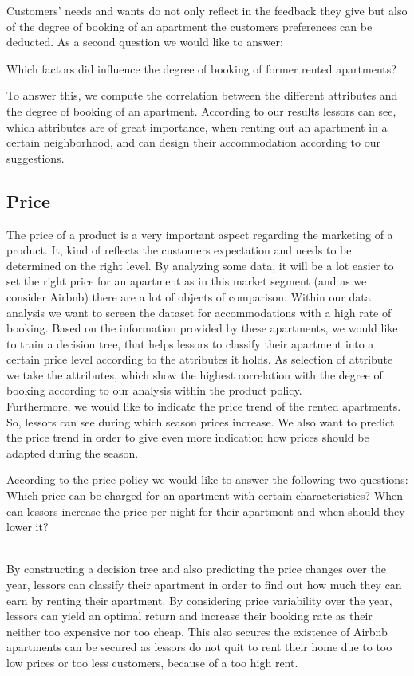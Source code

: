 Customers’ needs and wants do not only reflect in the feedback they give but also of the degree of booking of an apartment the customers preferences can be deducted. As a second question we would like to answer: \begin{itshape}Which factors did influence the degree of booking of former rented apartments? \end{itshape}To answer this, we compute the correlation between the different attributes and the degree of booking of an apartment. According to our results lessors can see, which attributes are of great importance, when renting out an apartment in a certain neighborhood, and can design their accommodation according to our suggestions. 

\subsection{Price}
\noindent The price of a product is a very important aspect regarding the marketing of a product. It, kind of reflects the customers expectation and needs to be determined on the right level. By analyzing some data, it will be a lot easier to set the right price for an apartment as in this market segment (and as we consider Airbnb) there are a lot of objects of comparison. Within our data analysis we want to screen the dataset for accommodations with a high rate of booking. Based on the information provided by these apartments, we would like to train a decision tree, that helps lessors to classify their apartment into a certain price level according to the attributes it holds. As selection of attribute we take the attributes, which show the highest correlation with the degree of booking according to our analysis within the product policy.\\ Furthermore, we would like to indicate the price trend of the rented apartments. So, lessors can see during which season prices increase. We also want to predict the price trend in order to give even more indication how prices should be adapted during the season.\\
\begin{itshape}
According to the price policy we would like to answer the following two questions: Which price can be charged for an apartment with certain characteristics? When can lessors increase the price per night for their apartment and when should they lower it?
\end{itshape}
\\By constructing a decision tree and also predicting the price changes over the year, lessors can classify their apartment in order to find out how much they can earn by renting their apartment. By considering price variability over the year, lessors can yield an optimal return and increase their booking rate as their neither too expensive nor too cheap. This also secures the existence of Airbnb apartments can be secured as lessors do not quit to rent their home due to too low prices or too less customers, because of a too high rent.
